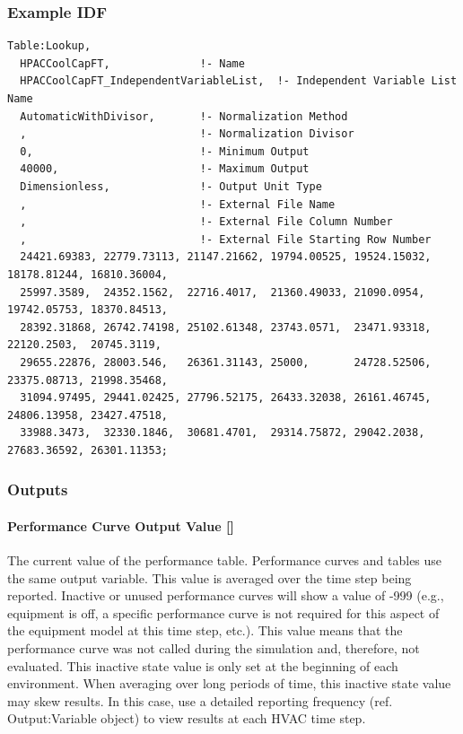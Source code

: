 \subsubsection{Example IDF}

\begin{lstlisting}
Table:Lookup,
  HPACCoolCapFT,              !- Name
  HPACCoolCapFT_IndependentVariableList,  !- Independent Variable List Name
  AutomaticWithDivisor,       !- Normalization Method
  ,                           !- Normalization Divisor
  0,                          !- Minimum Output
  40000,                      !- Maximum Output
  Dimensionless,              !- Output Unit Type
  ,                           !- External File Name
  ,                           !- External File Column Number
  ,                           !- External File Starting Row Number
  24421.69383, 22779.73113, 21147.21662, 19794.00525, 19524.15032, 18178.81244, 16810.36004,
  25997.3589,  24352.1562,  22716.4017,  21360.49033, 21090.0954,  19742.05753, 18370.84513,
  28392.31868, 26742.74198, 25102.61348, 23743.0571,  23471.93318, 22120.2503,  20745.3119,
  29655.22876, 28003.546,   26361.31143, 25000,       24728.52506, 23375.08713, 21998.35468,
  31094.97495, 29441.02425, 27796.52175, 26433.32038, 26161.46745, 24806.13958, 23427.47518,
  33988.3473,  32330.1846,  30681.4701,  29314.75872, 29042.2038,  27683.36592, 26301.11353;
\end{lstlisting}

\subsubsection{Outputs}

\paragraph{Performance Curve Output Value
{[}{]}}

The current value of the performance table. Performance curves and
tables use the same output variable. This value is averaged over the
time step being reported. Inactive or unused performance curves will
show a value of -999 (e.g., equipment is off, a specific performance
curve is not required for this aspect of the equipment model at this
time step, etc.). This value means that the performance curve was not
called during the simulation and, therefore, not evaluated. This
inactive state value is only set at the beginning of each environment.
When averaging over long periods of time, this inactive state value may
skew results. In this case, use a detailed reporting frequency (ref.
Output:Variable object) to view results at each HVAC time step.

